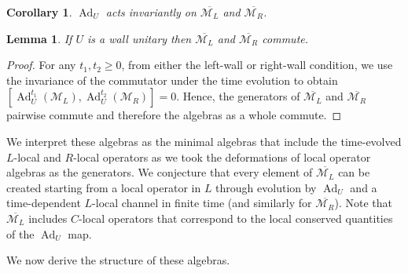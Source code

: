 \documentclass[11pt, twocolumn, floatfix, superscriptaddress, aps, prb, raggedbottom]{revtex4-2}
\newtheorem{lemma}[theorem]{Lemma}
\newtheorem{corollary}[theorem]{Corollary}
\DeclareMathOperator{\Ad}{Ad}
\begin{document}
\begin{corollary}
    $\Ad_U$ acts invariantly on $\overline{\mathcal{M}_L}$ and $ \overline{\mathcal{M}_R}$.
    \label{cor:invariant_algebras}
\end{corollary}

\begin{lemma}
    If $U$ is a wall unitary then $\overline{\mathcal{M}_L}$ and $\overline{\mathcal{M}_R}$ commute.
\end{lemma}
\begin{proof}
    For any $t_1,t_2 \ge 0$, from either the left-wall or right-wall condition, we use the invariance of the commutator under the time evolution to obtain
    $\left [\Ad_U^{t_1} (\mathcal{M}_L), \Ad_U^{t_2} (\mathcal{M}_R) \right] = 0$.
    Hence, the generators of $\overline{\mathcal{M}_L}$ and $\overline{\mathcal{M}_R}$ pairwise commute and therefore the algebras as a whole commute.
\end{proof}

We interpret these algebras as the minimal algebras that include the time-evolved $L$-local and $R$-local operators as we took the deformations of local operator algebras as the generators. We conjecture that every element of $\overline{\mathcal{M}_L}$ can be created starting from a local operator in $L$ through evolution by $\Ad_U$ and a time-dependent $L$-local channel in finite time (and similarly for $\overline{\mathcal{M}_R}$). Note that $\overline{\mathcal{M}_L}$ includes $C$-local operators that correspond to the local conserved quantities of the $\Ad_U$ map.

We now derive the structure of these algebras.
\end{document}
